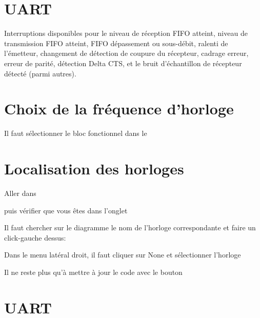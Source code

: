 {\section{UART}
Interruptions disponibles pour le niveau de réception FIFO atteint, niveau de transmission FIFO atteint, FIFO 
dépassement ou sous-débit, ralenti de l’émetteur, changement de détection de coupure du récepteur, cadrage 
erreur, erreur de parité, détection Delta CTS, et le bruit d’échantillon de récepteur détecté (parmi 
autres). 



\section{Choix de la fréquence d'horloge}

Il faut sélectionner le bloc fonctionnel dans le  

\section{Localisation des horloges}

Aller dans 

puis vérifier que vous êtes dans l'onglet 



Il faut chercher sur le diagramme le nom de l'horloge correspondante et faire un click-gauche dessus: 




Dans le menu latéral droit, il faut cliquer sur None et sélectionner l'horloge 



Il ne reste plus qu'à mettre à jour le code avec le bouton 





\section{UART}


}
